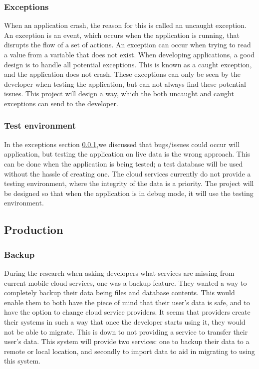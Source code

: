 \subsubsection{Exceptions} \label{testing subsection}

When an application crash, the reason for this is called an uncaught exception. An exception is an event, which occurs when the application is running, that disrupts the flow of a set of actions. An exception can occur when trying to read a value from a variable that does not exist. When developing applications, a good design is to handle all potential exceptions. This is known as a caught exception, and the application does not crash. These exceptions can only be seen by the developer when testing the application, but can not always find these potential issues. This project will design a way, which the both uncaught and caught exceptions can send to the developer.

\subsubsection{Test environment} \label{d-t:test_enviornment}

In the exceptions section \ref{testing subsection},we discussed that bugs/issues could occur will application, but testing the application on live data is the wrong approach. This can be done when the application is being tested; a test database will be used without the hassle of creating one. The cloud services currently do not provide a testing environment, where the integrity of the data is a priority. The project will be designed so that when the application is in debug mode, it will use the testing environment.

\subsection{Production}

\subsubsection{Backup} \label{d-p:backup}

During the research when asking developers what services are missing from current mobile cloud services, one was a backup feature. They wanted a way to completely backup their data being files and database contents. This would enable them to both have the piece of mind that their user's data is safe, and to have the option to change cloud service providers. It seems that providers create their systems in such a way that once the developer starts using it, they would not be able to migrate. This is down to not providing a service to transfer their user's data. This system will provide two services: one to backup their data to a remote or local location, and secondly to import data to aid in migrating to using this system.

